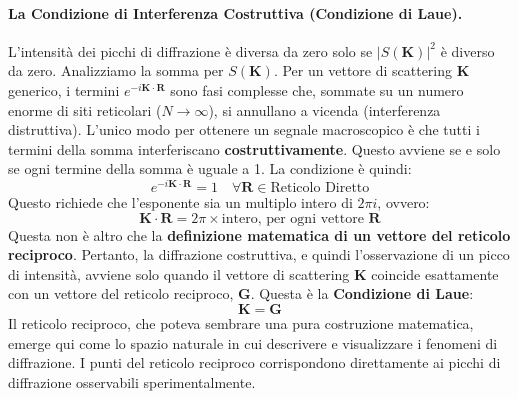 \paragraph{La Condizione di Interferenza Costruttiva (Condizione di Laue).}
L'intensità dei picchi di diffrazione è diversa da zero solo se \(|S(\mathbf{K})|^2\) è diverso da zero. Analizziamo la somma per \(S(\mathbf{K})\). Per un vettore di scattering \(\mathbf{K}\) generico, i termini \(e^{-i\mathbf{K}\cdot\mathbf{R}}\) sono fasi complesse che, sommate su un numero enorme di siti reticolari (\(N \to \infty\)), si annullano a vicenda (interferenza distruttiva).
L'unico modo per ottenere un segnale macroscopico è che tutti i termini della somma interferiscano \textbf{costruttivamente}. Questo avviene se e solo se ogni termine della somma è uguale a 1. La condizione è quindi:
\[ e^{-i\mathbf{K}\cdot\mathbf{R}} = 1 \quad \forall \mathbf{R} \in \text{Reticolo Diretto} \]
Questo richiede che l'esponente sia un multiplo intero di \(2\pi i\), ovvero:
\[ \mathbf{K} \cdot \mathbf{R} = 2\pi \times \text{intero, per ogni vettore } \mathbf{R} \]
Questa non è altro che la \textbf{definizione matematica di un vettore del reticolo reciproco}.
Pertanto, la diffrazione costruttiva, e quindi l'osservazione di un picco di intensità, avviene solo quando il vettore di scattering \(\mathbf{K}\) coincide esattamente con un vettore del reticolo reciproco, \(\mathbf{G}\). Questa è la \textbf{Condizione di Laue}:
\[ \mathbf{K} = \mathbf{G} \]
Il reticolo reciproco, che poteva sembrare una pura costruzione matematica, emerge qui come lo spazio naturale in cui descrivere e visualizzare i fenomeni di diffrazione. I punti del reticolo reciproco corrispondono direttamente ai picchi di diffrazione osservabili sperimentalmente.
